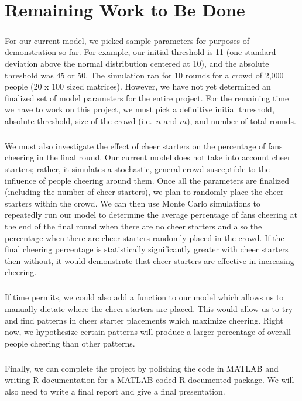 \documentclass[oneside,12pt]{report}
\def\prefacesection#1{
\chapter*{#1}
\addcontentsline{toc}{chapter}{#1}
}
\begin{document}
\prefacesection{Remaining Work to Be Done}
\paragraph{}
For our current model, we picked sample parameters for purposes of demonstration so far. For example, our initial threshold is 11 (one standard deviation above the normal distribution centered at 10), and the absolute threshold was 45 or 50. The simulation ran for 10 rounds for a crowd of 2,000 people ($20$ x $100$ sized matrices). However, we have not yet determined an finalized set of model parameters for the entire project. For the remaining time we have to work on this project, we must pick a definitive initial threshold, absolute threshold, size of the crowd (i.e.~$n$ and $m$), and number of total rounds.
\paragraph{}
We must also investigate the effect of cheer starters on the percentage of fans cheering in the final round. Our current model does not take into account cheer starters; rather, it simulates a stochastic, general crowd susceptible to the influence of people cheering around them. Once all the parameters are finalized (including the number of cheer starters), we plan to randomly place the cheer starters within the crowd. We can then use Monte Carlo simulations to repeatedly run our model to determine the average percentage of fans cheering at the end of the final round when there are no cheer starters and also the percentage when there are cheer starters randomly placed in the crowd. If the final cheering percentage is statistically significantly greater with cheer starters then without, it would demonstrate that cheer starters are effective in increasing cheering. 
 
\paragraph{}
If time permits, we could also add a function to our model which allows us to manually dictate where the cheer starters are placed. This would allow us to try and find patterns in cheer starter placements which maximize cheering. Right now, we hypothesize certain patterns will produce a larger percentage of overall people cheering than other patterns.

\paragraph{}
Finally, we can complete the project by polishing the code in MATLAB and writing R documentation for a MATLAB coded-R documented package. We will also need to write a final report and give a final presentation.
%
%
%
\end{document}
